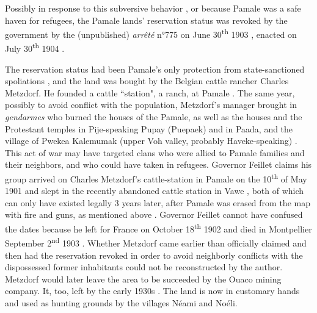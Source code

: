 Possibly in response to this subversive behavior \parencite[289]{saussol_lheritage_1979}, or because Pamale was a safe haven for refugees, the Pamale lands' reservation status was revoked by the government by the (unpublished) \textit{arrêté} n°775 on June 30\textsuperscript{th} 1903 \parencite[282]{guiart_evenements_1970}, enacted on July 30\textsuperscript{th} 1904 \parencites[92]{guiart_laire_1992}[22]{philcat_revolte_1989}. %

The reservation status had been Pamale's only protection from state-sanc\-tioned spoliations \parencite[3]{demmer_nationalisme_2003}, and the land was bought by the Belgian cattle rancher Charles Metzdorf. He founded a cattle ``station", a ranch, at Pamale \parencite[273]{guiart_evenements_1970}. The same year, possibly to avoid conflict with the population, Metzdorf's manager brought in \textit{gendarmes} who burned the houses of the Pamale, as well as the houses and the Protestant temples in Pije-speaking Pupay (Puepaek) and in Paada, and the village of Pwekea Kalemumak (upper Voh valley, probably Haveke-speaking) \parencite[266]{guiart_evenements_1970}. This act of war may have targeted clans who were allied to Pamale families and their neighbors, and who could have taken in refugees. Governor Feillet claims his group arrived on Charles Metzdorf's cattle-station in Pamale on the 10\textsuperscript{th} of May 1901 and slept in the recently abandoned cattle station in Vawe \parencite[26]{leenhardt_figures_1978}, both of which can only have existed legally 3 years later, after Pamale was erased from the map with fire and guns, as mentioned above \parencite[27]{leenhardt_figures_1978}. Governor Feillet cannot have confused the dates because he left for France on October 18\textsuperscript{th} 1902 and died in Montpellier September 2\textsuperscript{nd} 1903 \parencite[29]{leenhardt_figures_1978}. Whether Metzdorf came earlier than officially claimed and then had the reservation revoked in order to avoid neighborly conflicts with the dispossessed former inhabitants could not be reconstructed by the author. Metzdorf would later leave the area to be succeeded by the Ouaco mining company. It, too, left by the early 1930s \parencite[266]{guiart_evenements_1970}. The land is now in customary hands and used as hunting grounds by the villages Néami and Noéli.


